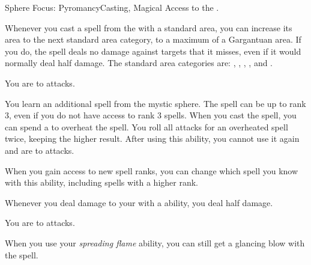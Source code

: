   \begin{magicalfeat}{Sphere Focus: Pyromancy}{Casting, Magical}
    \featpre Access to the  .

     Whenever you cast a spell from the   with a standard area, you can increase its area to the next standard area category, to a maximum of a Gargantuan area.
    If you do, the spell deals no damage against targets that it misses, even if it would normally deal half damage.
    The standard area categories are: \smallarea, \medarea, \largearea, \hugearea, and \gargarea.

     You are  to \atFire attacks.

     You learn an additional spell from the  mystic sphere.
    The spell can be up to rank 3, even if you do not have access to rank 3 spells.
    When you cast the spell, you can spend a  to  overheat the spell.
    You roll all attacks for an overheated spell twice, keeping the higher result.
    After using this ability, you  cannot use it again and are \vulnerable to \atCold attacks.

    When you gain access to new spell ranks, you can change which spell you know with this ability, including spells with a higher rank.

     Whenever you deal damage to your  with a \atFire ability, you deal half damage.

     You are  to \atFire attacks.

     When you use your \textit{spreading flame} ability, you can still get a glancing blow with the spell.
  \end{magicalfeat}

